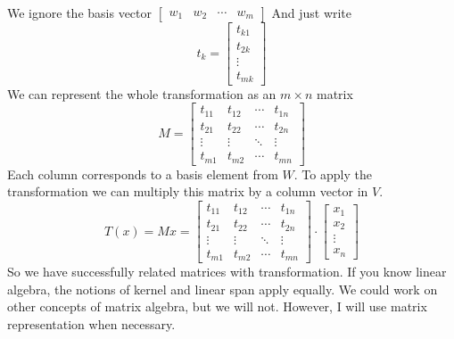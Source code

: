 \documentclass{book}
\begin{document}
We ignore the basis vector
$\left[
        \begin{matrix}
            w_1 & w_2 & \cdots & w_m
        \end{matrix}
        \right]$
And just write
\begin{equation}
    t_k=\left[
        \begin{matrix}
            t_{k1} \\ t_{2k} \\ \vdots \\ t_{mk}
        \end{matrix}
        \right]
\end{equation}
We can represent the whole transformation as an $m\times n$ matrix
\begin{equation}
    M=\left[
        \begin{matrix}
            t_{11} & t_{12} & \cdots & t_{1n} \\
            t_{21} & t_{22} & \cdots & t_{2n} \\
            \vdots & \vdots & \ddots & \vdots \\
            t_{m1} & t_{m2} & \cdots & t_{mn}
        \end{matrix}
        \right]
\end{equation}
Each column corresponds to a basis element from $W$. To apply the transformation
we can multiply this matrix by a column vector in $V$.
\begin{equation}
    T(x) = Mx = \left[
        \begin{matrix}
            t_{11} & t_{12} & \cdots & t_{1n} \\
            t_{21} & t_{22} & \cdots & t_{2n} \\
            \vdots & \vdots & \ddots & \vdots \\
            t_{m1} & t_{m2} & \cdots & t_{mn}
        \end{matrix}
        \right]\cdot \left[\begin{matrix}
            x_1 \\ x_2 \\ \vdots \\x_n
        \end{matrix}\right]
\end{equation}
So we have successfully related matrices with transformation. If you know linear algebra,
the notions of kernel and linear span apply equally. We could work on other concepts of matrix
algebra, but we will not. However, I will use matrix representation when necessary.
\end{document}
